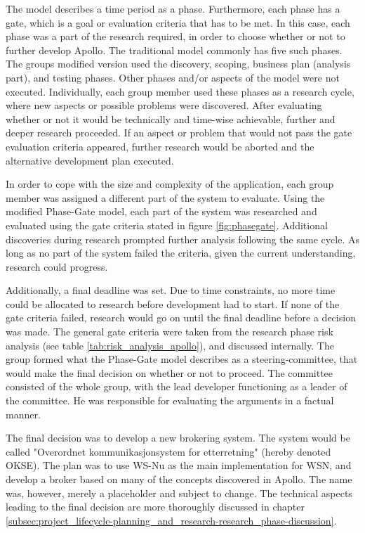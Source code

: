 The model describes a time period as a phase. Furthermore, each phase has a gate, which is a goal or evaluation criteria that has to be met. In this case, each phase was a part of the research required, in order to choose whether or not to further develop Apollo. The traditional model commonly has five such phases. The groups modified version used the discovery, scoping, business plan (analysis part), and testing phases. Other phases and/or aspects of the model were not executed. Individually, each group member used these phases as a research cycle, where new aspects or possible problems were discovered. After evaluating whether or not it would be technically and time-wise achievable, further and deeper research proceeded. If an aspect or problem that would not pass the gate evaluation criteria appeared, further research would be aborted and the alternative development plan executed.

In order to cope with the size and complexity of the application, each group member was assigned a different part of the system to evaluate. Using the modified Phase-Gate model, each part of the system was researched and evaluated using the gate criteria stated in figure \ref{fig:phasegate}. Additional discoveries during research prompted further analysis following the same cycle. As long as no part of the system failed the criteria, given the current understanding, research could progress.

Additionally, a final deadline was set. Due to time constraints, no more time could be allocated to research before development had to start. If none of the gate criteria failed, research would go on until the final deadline before a decision was made. The general gate criteria were taken from the research phase risk analysis (see table \ref{tab:risk_analysis_apollo}), and discussed internally. The group formed what the Phase-Gate model describes as a steering-committee, that would make the final decision on whether or not to proceed. The committee consisted of the whole group, with the lead developer functioning as a leader of the committee. He was responsible for evaluating the arguments in a factual manner. 

The final decision was to develop a new brokering system. The system would be called "Overordnet kommunikasjonsystem for etterretning" (hereby denoted OKSE). The plan was to use WS-Nu as the main implementation for WSN, and develop a broker based on many of the concepts discovered in Apollo. The name was, however, merely a placeholder and subject to change. The technical aspects leading to the final decision are more thoroughly discussed in chapter \ref{subsec:project_lifecycle-planning_and_research-research_phase-discussion}.

